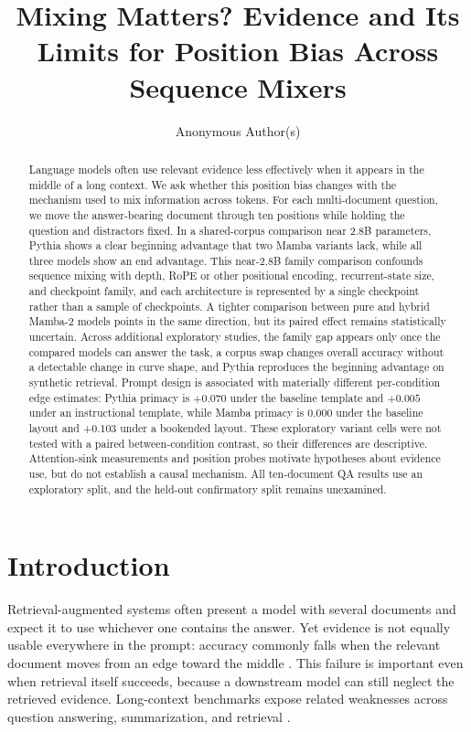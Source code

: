 \documentclass{article}
\title{Mixing Matters? Evidence and Its Limits for Position Bias Across Sequence Mixers}
\author{Anonymous Author(s)}
\begin{document}
\maketitle

\begin{abstract}
Language models often use relevant evidence less effectively when it appears in the middle of a long context.
We ask whether this position bias changes with the mechanism used to mix information across tokens.
For each multi-document question, we move the answer-bearing document through ten positions while holding the question and distractors fixed.
In a shared-corpus comparison near 2.8B parameters, Pythia shows a clear beginning advantage that two Mamba variants lack, while all three models show an end advantage.
This near-2.8B family comparison confounds sequence mixing with depth, RoPE or other positional encoding, recurrent-state size, and checkpoint family, and each architecture is represented by a single checkpoint rather than a sample of checkpoints.
A tighter comparison between pure and hybrid Mamba-2 models points in the same direction, but its paired effect remains statistically uncertain.
Across additional exploratory studies, the family gap appears only once the compared models can answer the task, a corpus swap changes overall accuracy without a detectable change in curve shape, and Pythia reproduces the beginning advantage on synthetic retrieval.
Prompt design is associated with materially different per-condition edge estimates: Pythia primacy is $+0.070$ under the baseline template and $+0.005$ under an instructional template, while Mamba primacy is $0.000$ under the baseline layout and $+0.103$ under a bookended layout.
These exploratory variant cells were not tested with a paired between-condition contrast, so their differences are descriptive.
Attention-sink measurements and position probes motivate hypotheses about evidence use, but do not establish a causal mechanism.
All ten-document QA results use an exploratory split, and the held-out confirmatory split remains unexamined.
\end{abstract}

\section{Introduction}
\label{sec:intro}

Retrieval-augmented systems often present a model with several documents and expect it to use whichever one contains the answer.
Yet evidence is not equally usable everywhere in the prompt: accuracy commonly falls when the relevant document moves from an edge toward the middle \citep{liu2024lost}.
This failure is important even when retrieval itself succeeds, because a downstream model can still neglect the retrieved evidence.
Long-context benchmarks expose related weaknesses across question answering, summarization, and retrieval \citep{bai2024longbench,shaham2023zeroscrolls,li2024loogle}.
\end{document}
